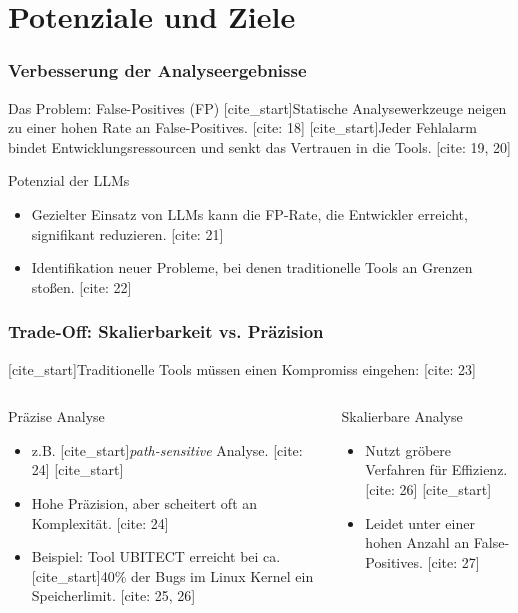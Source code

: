 \documentclass{beamer}
\begin{document}
\section{Potenziale und Ziele}

\begin{frame}
\frametitle{Verbesserung der Analyseergebnisse}
\begin{alertblock}{Das Problem: False-Positives (FP)}
    [cite_start]Statische Analysewerkzeuge neigen zu einer hohen Rate an False-Positives. [cite: 18] [cite_start]Jeder Fehlalarm bindet Entwicklungsressourcen und senkt das Vertrauen in die Tools. [cite: 19, 20]
\end{alertblock} \pause

\begin{block}{Potenzial der LLMs}
    \begin{itemize}
        [cite_start]\item Gezielter Einsatz von LLMs kann die FP-Rate, die Entwickler erreicht, signifikant reduzieren. [cite: 21] \item Identifikation neuer Probleme, bei denen traditionelle Tools an Grenzen stoßen. [cite: 22]
    \end{itemize}
\end{block}
\end{frame}

\begin{frame}
\frametitle{Trade-Off: Skalierbarkeit vs. Präzision}
[cite_start]Traditionelle Tools müssen einen Kompromiss eingehen: [cite: 23]

\begin{columns}
    \begin{block}{Präzise Analyse}
        \begin{itemize}
            \item z.B. [cite_start]\textit{path-sensitive} Analyse. [cite: 24]
            [cite_start]\item Hohe Präzision, aber scheitert oft an Komplexität. [cite: 24]
            \item \alert{Beispiel:} Tool UBITECT erreicht bei ca. [cite_start]40\% der Bugs im Linux Kernel ein Speicherlimit. [cite: 25, 26]
        \end{itemize}
    \end{block}

    \begin{block}{Skalierbare Analyse}
        \begin{itemize}
            [cite_start]\item Nutzt gröbere Verfahren für Effizienz. [cite: 26]
            [cite_start]\item Leidet unter einer hohen Anzahl an False-Positives. [cite: 27]
        \end{itemize}
    \end{block}
\end{columns}
\end{frame}
\end{document}
